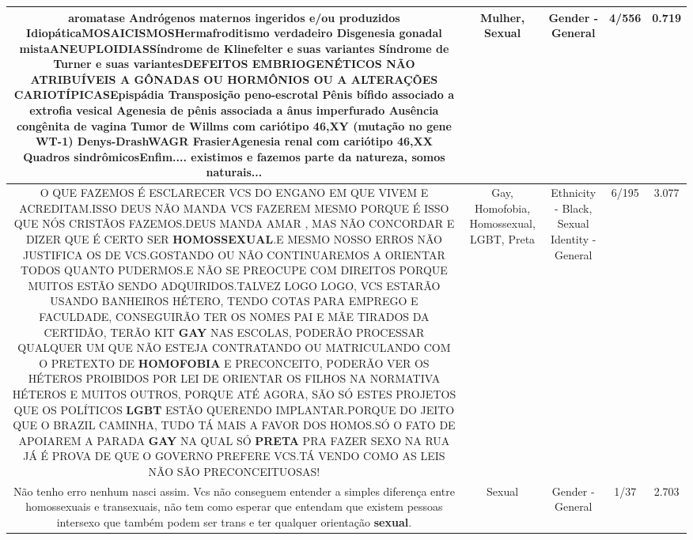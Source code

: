 \documentclass[11pt]{article}
\newlength\mylength
\begin{document}
\begin{center}
\begin{longtable}{|C{.65\mylength}|C{.30\mylength}|C{.12\mylength}|C{.12\mylength}|C{.12\mylength}|}
aromatase Andrógenos maternos ingeridos e/ou produzidos IdiopáticaMOSAICISMOSHermafroditismo verdadeiro Disgenesia gonadal mistaANEUPLOIDIASSíndrome de Klinefelter e suas variantes Síndrome de Turner e suas variantesDEFEITOS EMBRIOGENÉTICOS NÃO ATRIBUÍVEIS A GÔNADAS OU HORMÔNIOS OU A ALTERAÇÕES CARIOTÍPICASEpispádia Transposição peno-escrotal Pênis bífido associado a extrofia vesical Agenesia de pênis associada a ânus imperfurado Ausência congênita de vagina Tumor de Willms com cariótipo 46,XY (mutação no gene WT-1) Denys-DrashWAGR FrasierAgenesia renal com cariótipo 46,XX Quadros sindrômicosEnfim.... existimos e fazemos parte da natureza, somos naturais...\normalsize   & Mulher, Sexual & Gender - General & 4/556 & 0.719 \\  \hline
  \small O QUE FAZEMOS É ESCLARECER VCS DO ENGANO EM QUE VIVEM E ACREDITAM.ISSO DEUS NÃO MANDA VCS FAZEREM MESMO PORQUE É ISSO QUE NÓS CRISTÃOS FAZEMOS.DEUS MANDA AMAR , MAS NÃO CONCORDAR E DIZER QUE É CERTO SER \textbf{HOMOSSEXUAL}.E MESMO NOSSO ERROS NÃO JUSTIFICA OS DE VCS.GOSTANDO OU NÃO CONTINUAREMOS A ORIENTAR TODOS QUANTO PUDERMOS.E NÃO SE PREOCUPE COM DIREITOS PORQUE MUITOS ESTÃO SENDO ADQUIRIDOS.TALVEZ LOGO LOGO, VCS ESTARÃO USANDO BANHEIROS HÉTERO, TENDO COTAS PARA EMPREGO E FACULDADE, CONSEGUIRÃO TER OS NOMES PAI E MÃE TIRADOS DA CERTIDÃO, TERÃO KIT \textbf{GAY} NAS ESCOLAS, PODERÃO PROCESSAR QUALQUER UM QUE NÃO ESTEJA CONTRATANDO OU MATRICULANDO COM O PRETEXTO DE \textbf{HOMOFOBIA} E PRECONCEITO, PODERÃO VER OS HÉTEROS PROIBIDOS POR LEI DE ORIENTAR OS FILHOS NA NORMATIVA HÉTEROS E MUITOS OUTROS, PORQUE ATÉ AGORA, SÃO SÓ ESTES PROJETOS QUE OS POLÍTICOS \textbf{LGBT} ESTÃO QUERENDO IMPLANTAR.PORQUE DO JEITO QUE O BRAZIL CAMINHA, TUDO TÁ MAIS A FAVOR DOS HOMOS.SÓ O FATO DE APOIAREM A PARADA \textbf{GAY} NA QUAL SÓ \textbf{PRETA} PRA FAZER SEXO NA RUA JÁ É PROVA DE QUE O GOVERNO PREFERE VCS.TÁ VENDO COMO AS LEIS NÃO SÃO PRECONCEITUOSAS!\normalsize   & Gay, Homofobia, Homossexual, LGBT, Preta & Ethnicity - Black, Sexual Identity - General & 6/195 & 3.077 \\  \hline
  \small Não tenho erro nenhum nasci assim. Vcs não conseguem entender a simples diferença entre homossexuais e transexuais, não tem como esperar que entendam que existem pessoas intersexo que também podem ser trans e ter qualquer orientação \textbf{sexual}.\normalsize   & Sexual & Gender - General & 1/37 & 2.703 \\  \hline

\end{longtable}
\end{center}
\end{document}
